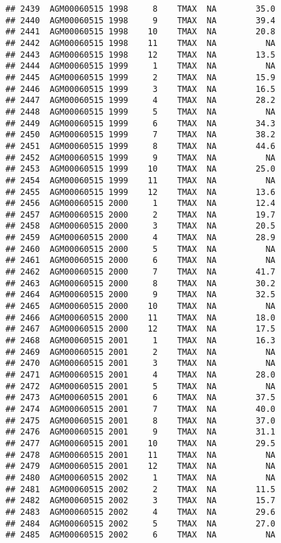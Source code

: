 \documentclass{article}\usepackage[]{graphicx}\usepackage[]{color}
\makeatletter
\newenvironment{kframe}{%
 \def\at@end@of@kframe{}%
 \ifinner\ifhmode%
  \def\at@end@of@kframe{\end{minipage}}%
  \begin{minipage}{\columnwidth}%
 \fi\fi%
 \def\FrameCommand##1{\hskip\@totalleftmargin \hskip-\fboxsep
 \colorbox{shadecolor}{##1}\hskip-\fboxsep
     \hskip-\linewidth \hskip-\@totalleftmargin \hskip\columnwidth}%
 \MakeFramed {\advance\hsize-\width
   \@totalleftmargin\z@ \linewidth\hsize
   \@setminipage}}%
 {\par\unskip\endMakeFramed%
 \at@end@of@kframe}
\newenvironment{knitrout}{}{} %
\makeatother
\begin{document}
\begin{knitrout}
\begin{kframe}
\begin{verbatim}
## 2439  AGM00060515 1998     8    TMAX  NA        35.0
## 2440  AGM00060515 1998     9    TMAX  NA        39.4
## 2441  AGM00060515 1998    10    TMAX  NA        20.8
## 2442  AGM00060515 1998    11    TMAX  NA          NA
## 2443  AGM00060515 1998    12    TMAX  NA        13.5
## 2444  AGM00060515 1999     1    TMAX  NA          NA
## 2445  AGM00060515 1999     2    TMAX  NA        15.9
## 2446  AGM00060515 1999     3    TMAX  NA        16.5
## 2447  AGM00060515 1999     4    TMAX  NA        28.2
## 2448  AGM00060515 1999     5    TMAX  NA          NA
## 2449  AGM00060515 1999     6    TMAX  NA        34.3
## 2450  AGM00060515 1999     7    TMAX  NA        38.2
## 2451  AGM00060515 1999     8    TMAX  NA        44.6
## 2452  AGM00060515 1999     9    TMAX  NA          NA
## 2453  AGM00060515 1999    10    TMAX  NA        25.0
## 2454  AGM00060515 1999    11    TMAX  NA          NA
## 2455  AGM00060515 1999    12    TMAX  NA        13.6
## 2456  AGM00060515 2000     1    TMAX  NA        12.4
## 2457  AGM00060515 2000     2    TMAX  NA        19.7
## 2458  AGM00060515 2000     3    TMAX  NA        20.5
## 2459  AGM00060515 2000     4    TMAX  NA        28.9
## 2460  AGM00060515 2000     5    TMAX  NA          NA
## 2461  AGM00060515 2000     6    TMAX  NA          NA
## 2462  AGM00060515 2000     7    TMAX  NA        41.7
## 2463  AGM00060515 2000     8    TMAX  NA        30.2
## 2464  AGM00060515 2000     9    TMAX  NA        32.5
## 2465  AGM00060515 2000    10    TMAX  NA          NA
## 2466  AGM00060515 2000    11    TMAX  NA        18.0
## 2467  AGM00060515 2000    12    TMAX  NA        17.5
## 2468  AGM00060515 2001     1    TMAX  NA        16.3
## 2469  AGM00060515 2001     2    TMAX  NA          NA
## 2470  AGM00060515 2001     3    TMAX  NA          NA
## 2471  AGM00060515 2001     4    TMAX  NA        28.0
## 2472  AGM00060515 2001     5    TMAX  NA          NA
## 2473  AGM00060515 2001     6    TMAX  NA        37.5
## 2474  AGM00060515 2001     7    TMAX  NA        40.0
## 2475  AGM00060515 2001     8    TMAX  NA        37.0
## 2476  AGM00060515 2001     9    TMAX  NA        31.1
## 2477  AGM00060515 2001    10    TMAX  NA        29.5
## 2478  AGM00060515 2001    11    TMAX  NA          NA
## 2479  AGM00060515 2001    12    TMAX  NA          NA
## 2480  AGM00060515 2002     1    TMAX  NA          NA
## 2481  AGM00060515 2002     2    TMAX  NA        11.5
## 2482  AGM00060515 2002     3    TMAX  NA        15.7
## 2483  AGM00060515 2002     4    TMAX  NA        29.6
## 2484  AGM00060515 2002     5    TMAX  NA        27.0
## 2485  AGM00060515 2002     6    TMAX  NA          NA

\end{verbatim}
\end{kframe}
\end{knitrout}
\end{document}
